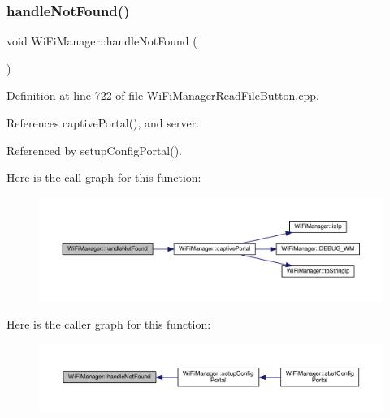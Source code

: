 \subsubsection{\texorpdfstring{handle\+Not\+Found()}{handleNotFound()}}
{\footnotesize\ttfamily void Wi\+Fi\+Manager\+::handle\+Not\+Found (\begin{DoxyParamCaption}{ }\end{DoxyParamCaption})\hspace{0.3cm}{\ttfamily [private]}}



Definition at line 722 of file Wi\+Fi\+Manager\+Read\+File\+Button.\+cpp.



References captive\+Portal(), and server.



Referenced by setup\+Config\+Portal().

Here is the call graph for this function\+:\nopagebreak
\begin{figure}[H]
\begin{center}
\leavevmode
\includegraphics[width=350pt]{d4/dc8/class_wi_fi_manager_a7d01f7de3e4b76acdabffac79fa3d0ab_cgraph}
\end{center}
\end{figure}
Here is the caller graph for this function\+:\nopagebreak
\begin{figure}[H]
\begin{center}
\leavevmode
\includegraphics[width=350pt]{d4/dc8/class_wi_fi_manager_a7d01f7de3e4b76acdabffac79fa3d0ab_icgraph}
\end{center}
\end{figure}
\mbox{\label{class_wi_fi_manager_ac924dc071144e609afcf52073176c11f}} 

